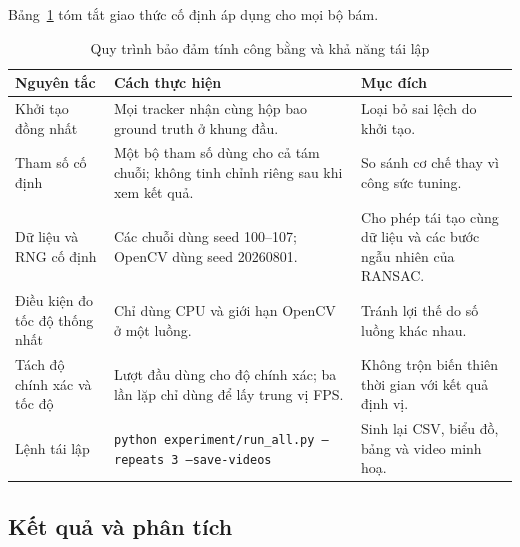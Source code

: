 \documentclass[12pt,a4paper]{article}
\numberwithin{equation}{section}
\begin{document}
Bảng~\ref{tab:fairness} tóm tắt giao thức cố định áp dụng cho mọi bộ bám.

\begin{table}[H]
\centering
\caption{Quy trình bảo đảm tính công bằng và khả năng tái lập}
\label{tab:fairness}
\small
\begin{tabular}{@{}p{3.7cm}p{6.0cm}p{4.0cm}@{}}
\toprule
\textbf{Nguyên tắc} & \textbf{Cách thực hiện} & \textbf{Mục đích} \\
\midrule
Khởi tạo đồng nhất & Mọi tracker nhận cùng hộp bao ground truth ở khung đầu. & Loại bỏ sai lệch do khởi tạo. \\
Tham số cố định & Một bộ tham số dùng cho cả tám chuỗi; không tinh chỉnh riêng sau khi xem kết quả. & So sánh cơ chế thay vì công sức tuning. \\
Dữ liệu và RNG cố định & Các chuỗi dùng seed 100--107; OpenCV dùng seed 20260801. & Cho phép tái tạo cùng dữ liệu và các bước ngẫu nhiên của RANSAC. \\
Điều kiện đo tốc độ thống nhất & Chỉ dùng CPU và giới hạn OpenCV ở một luồng. & Tránh lợi thế do số luồng khác nhau. \\
Tách độ chính xác và tốc độ & Lượt đầu dùng cho độ chính xác; ba lần lặp chỉ dùng để lấy trung vị FPS. & Không trộn biến thiên thời gian với kết quả định vị. \\
Lệnh tái lập & \texttt{python experiment/run\_all.py --repeats 3 --save-videos} & Sinh lại CSV, biểu đồ, bảng và video minh hoạ. \\
\bottomrule
\end{tabular}
\end{table}


\subsection{Kết quả và phân tích}

\end{document}
